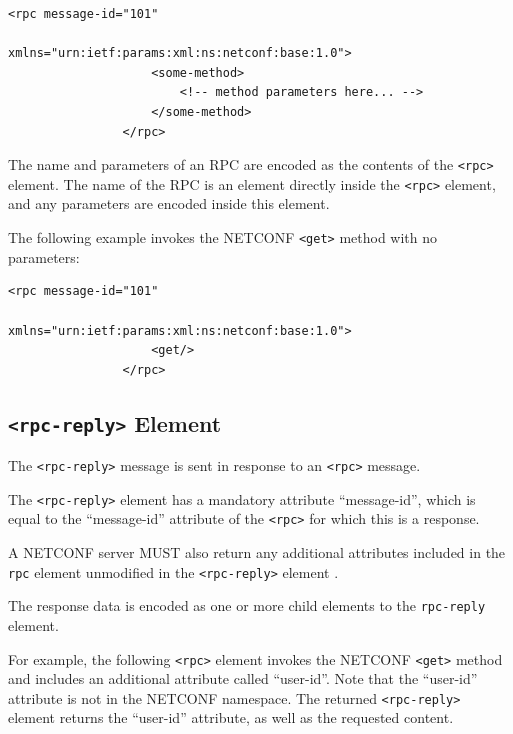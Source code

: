 \begin{lstlisting}[style=xmlStyle, caption={\texttt{<rpc>} Model.}, backgroundcolor=\color{codebackground}]
                <rpc message-id="101"
                        xmlns="urn:ietf:params:xml:ns:netconf:base:1.0">
                    <some-method>
                        <!-- method parameters here... -->
                    </some-method>
                </rpc>             
\end{lstlisting}

The name and parameters of an RPC are encoded as the contents of the \texttt{<rpc>} element. The name of the RPC is an element directly inside the \texttt{<rpc>} element, and any parameters are encoded inside this element.

The following example invokes the NETCONF \texttt{<get>} method with no parameters:

\begin{lstlisting}[style=xmlStyle, caption={\texttt{<rpc>} \texttt{<get>} Model.}, backgroundcolor=\color{codebackground}]
                <rpc message-id="101"
                        xmlns="urn:ietf:params:xml:ns:netconf:base:1.0">
                    <get/>
                </rpc>           
\end{lstlisting}




\subsection{\texttt{<rpc-reply>} Element}


The \texttt{<rpc-reply>} message is sent in response to an \texttt{<rpc>} message.

The \texttt{<rpc-reply>} element has a mandatory attribute ``message-id'', which is equal to the ``message-id'' attribute of the \texttt{<rpc>} for which this is a response.

A NETCONF server MUST also return any additional attributes included in the \texttt{rpc} element unmodified in the \texttt{<rpc-reply>} element \cite{RFC6241N8}.

The response data is encoded as one or more child elements to the \texttt{rpc-reply} element.

For example, the following \texttt{<rpc>} element invokes the NETCONF \texttt{<get>} method and includes an additional attribute called ``user-id''.  Note that the ``user-id'' attribute is not in the NETCONF namespace.  The returned \texttt{<rpc-reply>} element returns the ``user-id'' attribute, as well as the requested content.


